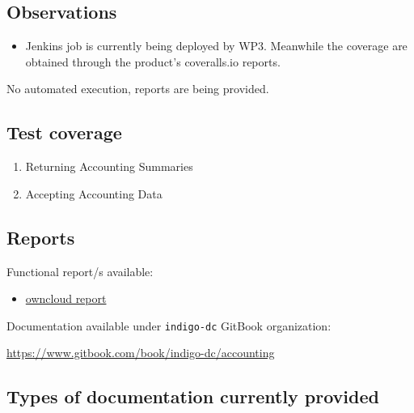 \documentclass[a4wide,11pt]{article}
\begin{document}
\subsection{Observations}
\begin{itemize}
        \item Jenkins job is currently being deployed by WP3. Meanwhile the coverage are obtained through the product's coveralls.io reports.
    \end{itemize}




\label{sec:func_int_test}

No automated execution, reports are being provided.

\subsection{Test coverage}
\begin{enumerate}
        \item Returning Accounting Summaries
        \item Accepting Accounting Data
    \end{enumerate}

\subsection{Reports}
Functional report/s available:
\begin{itemize}
        \item \href{https://owncloud.indigo-datacloud.eu/index.php/apps/files/ajax/download.php?dir=%2FINDIGO-DC%20testing%20reports%2Ffunctional%2Findigo_1%2FAccounting&files=wp3-3278.pdf}{owncloud report}
    \end{itemize}




\label{sec:gitbook}
Documentation available under \texttt{indigo-dc} GitBook organization: \vspace{0.1em} \begin{center}\url{https://www.gitbook.com/book/indigo-dc/accounting}\end{center} 
\subsection{Types of documentation currently provided}
\begin{center}
\end{center}
\end{document}
